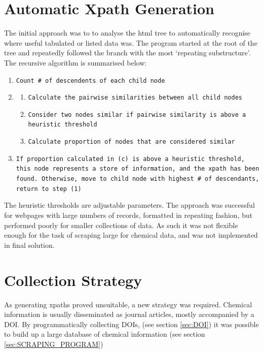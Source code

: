 \section{Automatic Xpath Generation}
The initial approach was to to analyse the html tree to automatically recognise where useful tabulated or listed data was. The program started at the root of the tree and repeatedly followed the branch with the most `repeating substructure'. The recursive algorithm is summarised below:
\begin{sloppypar}
\begin{enumerate}
\item \texttt{Count \# of descendents of each child node}
\item \begin{enumerate}
\item \texttt{Calculate the pairwise similarities between all child nodes}
\item \texttt{Consider  two nodes similar if pairwise similarity is above a heuristic threshold}
\item \texttt{Calculate proportion of nodes that are considered similar}
\end{enumerate}
\item \texttt{If proportion calculated in (c) is above a heuristic threshold, this node represents a store of information, and the xpath has been found. Otherwise, move to child node with highest \# of descendants, return to step (1)}
\end{enumerate}
\end{sloppypar}
The heuristic thresholds are adjustable parameters. The approach was successful for webpages with large numbers of records, formatted in repeating fashion, but performed poorly for smaller collections of data. As such it was not flexible enough for the task of scraping large for chemical data, and was not implemented in final solution.
\section{Collection Strategy}
As generating xpaths proved unsuitable, a new strategy was required. Chemical information is usually disseminated as journal articles, mostly accompanied by a DOI. By programmatically collecting DOIs, (see section \ref{sec:DOI}) it was possible to build up a large database of chemical information (see section \ref{sec:SCRAPING_PROGRAM})
